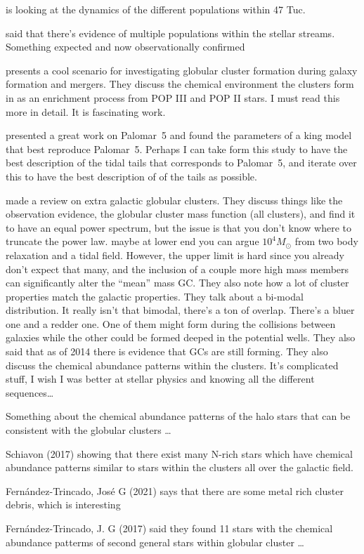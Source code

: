        \citet{2025MNRAS.537.2342C} is looking at the dynamics of the different populations within 47 Tuc.

        \citet{2024MNRAS.529.2413U} said that there's evidence of multiple populations within the stellar streams. Something expected and now observationally confirmed     

        \citet{2025MNRAS.540.1235C} presents a cool scenario for investigating globular cluster formation during galaxy formation and mergers. They discuss the chemical environment the clusters form in as an enrichment process from POP III and POP II stars. I must read this more in detail. It is fascinating work. 

        \citet{2004AJ....127.2753D} presented a great work on Palomar~5 and found the parameters of a king model that best reproduce Palomar~5. Perhaps I can take form this study to have the best description of the tidal tails that corresponds to Palomar~5, and iterate over this to have the best description of of the tails as possible. 

        \citet{2006ARA&A..44..193B} made a review on extra galactic globular clusters. They discuss things like the observation evidence, the globular cluster mass function (all clusters), and find it to have an equal power spectrum, but the issue is that you don't know where to truncate the power law. maybe at lower end you can argue $10^4 M_\odot$ from two body relaxation and a tidal field. However, the upper limit is hard since you already don't expect that many, and the inclusion of a couple more high mass members can significantly alter the ``mean'' mass GC. They also note how a lot of cluster properties match the galactic properties. They talk about a bi-modal distribution. It really isn't that bimodal, there's a ton of overlap. There's a bluer one and a redder one. One of them might form during the collisions between galaxies while the other could be formed deeped in the potential wells. They also said that as of 2014 there is evidence that GCs are still forming. They also discuss the chemical abundance patterns within the clusters. It's complicated stuff, I wish I was better at stellar physics and knowing all the different sequences\dots

        Something about the chemical abundance patterns of the halo stars that can be consistent with the globular clusters \dots

        Schiavon (2017) showing that there exist many N-rich stars which have chemical abundance patterns similar to stars within the clusters all over the galactic field. 

        Fernández-Trincado, José G (2021) says that there are some metal rich cluster debris, which is interesting 

        Fernández-Trincado, J. G (2017) said they found 11 stars with the chemical abundance patterms of second general stars within globular cluster \dots 
